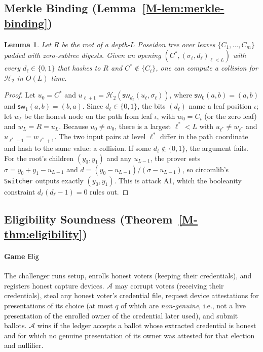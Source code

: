 \documentclass[10pt,letterpaper,journal]{IEEEtran}
\newtheorem{lemma}[theorem]{Lemma}
\begin{document}
\subsection{Merkle Binding (Lemma~\ref{M-lem:merkle-binding})}
\label{sec:supp-proof-merkle-binding}

\begin{lemma}
\label{lem:supp-merkle-binding}
Let $R$ be the root of a depth-$L$ Poseidon tree over leaves $\{C_1, \ldots, C_m\}$ padded with zero-subtree digests. Given an opening $(C^\ast, (\sigma_\ell, d_\ell)_{\ell<L})$ with every $d_\ell \in \{0,1\}$ that hashes to $R$ and $C^\ast \notin \{C_i\}$, one can compute a collision for $\mathcal{H}_2$ in $O(L)$ time.
\end{lemma}

\begin{proof}
Let $u_0 = C^\ast$ and $u_{\ell+1} = \mathcal{H}_2(\mathsf{sw}_{d_\ell}(u_\ell, \sigma_\ell))$, where $\mathsf{sw}_0(a,b) = (a,b)$ and $\mathsf{sw}_1(a,b) = (b,a)$. Since $d_\ell \in \{0,1\}$, the bits $(d_\ell)$ name a leaf position $\iota$; let $w_\ell$ be the honest node on the path from leaf $\iota$, with $w_0 = C_\iota$ (or the zero leaf) and $w_L = R = u_L$. Because $u_0 \neq w_0$, there is a largest $\ell^\ast < L$ with $u_{\ell^\ast} \neq w_{\ell^\ast}$ and $u_{\ell^\ast+1} = w_{\ell^\ast+1}$. The two input pairs at level $\ell^\ast$ differ in the path coordinate and hash to the same value: a collision. If some $d_\ell \notin \{0,1\}$, the argument fails. For the root's children $(y_0, y_1)$ and any $u_{L-1}$, the prover sets $\sigma = y_0 + y_1 - u_{L-1}$ and $d = (y_0 - u_{L-1})/(\sigma - u_{L-1})$, so circomlib's \texttt{Switcher} outputs exactly $(y_0, y_1)$. This is attack A1, which the booleanity constraint $d_\ell(d_\ell - 1) = 0$ rules out.
\end{proof}

\subsection{Eligibility Soundness (Theorem~\ref{M-thm:eligibility})}
\label{sec:supp-proof-eligibility}

\paragraph{Game $\mathsf{Elig}$} The challenger runs setup, enrolls honest voters (keeping their credentials), and registers honest capture devices. $\mathcal{A}$ may corrupt voters (receiving their credentials), steal any honest voter's credential file, request device attestations for presentations of its choice (at most $q$ of which are \emph{non-genuine}, i.e., not a live presentation of the enrolled owner of the credential later used), and submit ballots. $\mathcal{A}$ wins if the ledger accepts a ballot whose extracted credential is honest and for which no genuine presentation of its owner was attested for that election and nullifier.
\end{document}
